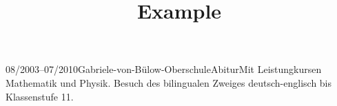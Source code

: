 \documentclass[a4paper]{article}
\title{Example}
\begin{document}
\blindtext{}

\blindtext{}

\begin{eventlist}
	\item{08/2003--07/2010}{Gabriele-von-Bülow-Oberschule}{Abitur}{Mit Leistungkursen Mathematik und Physik. Besuch des bilingualen Zweiges deutsch-englisch bis Klassenstufe 11.}
\end{eventlist}
\blindtext{}
\newpage
\end{document}
